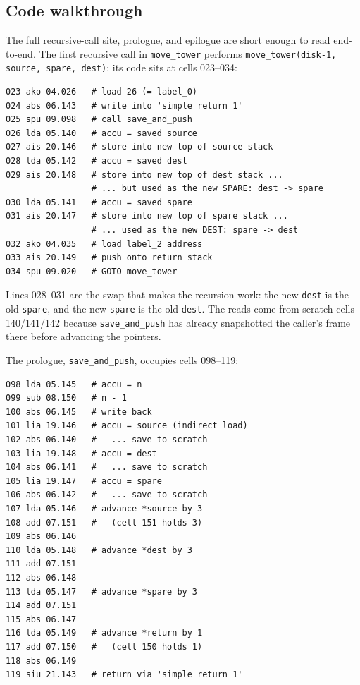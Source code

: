 \documentclass[11pt,a4paper]{article}
\begin{document}
\subsection{Code walkthrough}

The full recursive-call site, prologue, and epilogue are short enough
to read end-to-end. The first recursive call in \texttt{move\_tower}
performs \texttt{move\_tower(disk-1, source, spare, dest)}; its code
sits at cells 023--034:

\begin{lstlisting}
023 ako 04.026   # load 26 (= label_0)
024 abs 06.143   # write into 'simple return 1'
025 spu 09.098   # call save_and_push
026 lda 05.140   # accu = saved source
027 ais 20.146   # store into new top of source stack
028 lda 05.142   # accu = saved dest
029 ais 20.148   # store into new top of dest stack ...
                 # ... but used as the new SPARE: dest -> spare
030 lda 05.141   # accu = saved spare
031 ais 20.147   # store into new top of spare stack ...
                 # ... used as the new DEST: spare -> dest
032 ako 04.035   # load label_2 address
033 ais 20.149   # push onto return stack
034 spu 09.020   # GOTO move_tower
\end{lstlisting}

\noindent
Lines 028--031 are the swap that makes the recursion work: the new
\texttt{dest} is the old \texttt{spare}, and the new \texttt{spare}
is the old \texttt{dest}. The reads come from scratch cells
140/141/142 because \texttt{save\_and\_push} has already snapshotted
the caller's frame there before advancing the pointers.

The prologue, \texttt{save\_and\_push}, occupies cells 098--119:

\begin{lstlisting}
098 lda 05.145   # accu = n
099 sub 08.150   # n - 1
100 abs 06.145   # write back
101 lia 19.146   # accu = source (indirect load)
102 abs 06.140   #   ... save to scratch
103 lia 19.148   # accu = dest
104 abs 06.141   #   ... save to scratch
105 lia 19.147   # accu = spare
106 abs 06.142   #   ... save to scratch
107 lda 05.146   # advance *source by 3
108 add 07.151   #   (cell 151 holds 3)
109 abs 06.146
110 lda 05.148   # advance *dest by 3
111 add 07.151
112 abs 06.148
113 lda 05.147   # advance *spare by 3
114 add 07.151
115 abs 06.147
116 lda 05.149   # advance *return by 1
117 add 07.150   #   (cell 150 holds 1)
118 abs 06.149
119 siu 21.143   # return via 'simple return 1'
\end{lstlisting}
\end{document}
